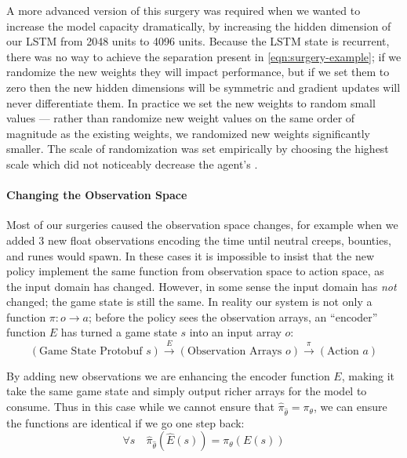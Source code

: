 \documentclass[ocean-paper.tex]{subfiles}
\begin{document}
A more advanced version of this surgery was required when we wanted to increase the model capacity dramatically, by increasing the hidden dimension of our LSTM from 2048 units to 4096 units.
Because the LSTM state is recurrent, there was no way to achieve the separation present in \autoref{eqn:surgery-example}; if we randomize the new weights they will impact performance, but if we set them to zero then the new hidden dimensions will be symmetric and gradient updates will never differentiate them. 
In practice we set the new weights to random small values --- rather than randomize new weight values on the same order of magnitude as the existing weights, we randomized new weights significantly smaller. 
The scale of randomization was set empirically by choosing the highest scale which did not noticeably decrease the agent's \trueskillname.

\paragraph{Changing the Observation Space}
Most of our surgeries caused the observation space changes, for example when we added 3 new float observations encoding the time until neutral creeps, bounties, and runes would spawn.
In these cases it is impossible to insist that the new policy implement the same function from observation space to action space, as the input domain has changed.
However, in some sense the input domain has {\it not} changed; the game state is still the same.
In reality our system is not only a function $\pi:o\to a$; before the policy sees the observation arrays, an ``encoder'' function $E$ has turned a game state $s$ into an input array $o$:
\begin{equation}
    \left(
    \textrm{Game State Protobuf } s
    \right)
    \xrightarrow{E}
    \left(
    \textrm{Observation Arrays } o
    \right)
    \xrightarrow{\pi}
    \left(
    \textrm{Action } a
    \right)
\end{equation}

By adding new observations we are enhancing the encoder function $E$, making it take the same game state and simply output richer arrays for the model to consume.
Thus in this case while we cannot ensure that $\hat\pi_{\hat\theta} = \pi_\theta$, we can ensure the functions are identical if we go one step back:
\begin{equation}
    \forall s \hspace{1em}
    \hat\pi_{\hat\theta}(\hat{E}(s))
    = \pi_\theta(E(s))
\end{equation}
\end{document}
